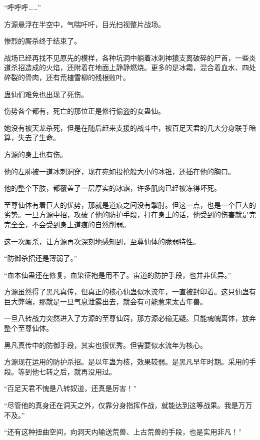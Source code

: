 
\begin{this_body}



“呼呼呼……”

方源悬浮在半空中，气喘吁吁，目光扫视整片战场。

惨烈的厮杀终于结束了。

战场已经再找不见原先的模样，各种坑洞中躺着冰刺神猿支离破碎的尸首，一些炎道杀招造成的火焰，还附着在地面上静静燃烧。更多的是冰霜，混合着血水、四处碎裂的骨肉，还有荒植雪柳的残根败叶。

蛊仙们难免也出现了死伤。

伤势各个都有，死亡的那位正是修行偷盗的女蛊仙。

她没有被天龙杀死，但是在随后赶来支援的战斗中，被百足天君的几大分身联手暗算，失去了生命。

方源的身上也有伤。

他的左肺被一道冰刺洞穿，现在宛如投枪般大小的冰锥，还插在他的胸口。

他的整个下肢，都覆盖了一层厚实的冰霜，许多肌肉已经被冻得坏死。

至尊仙体有着巨大的优势，那就是道痕之间没有掣肘。但这一点，也是一个巨大的劣势。一旦方源中招，攻破了他的防护手段，打在身上的话，他受到的伤害就是完完全全，不会受到身上道痕的自然削弱。

这一次厮杀，让方源再次深刻地感知到，至尊仙体的脆弱特性。

“防御杀招还是薄弱了。”

“血本仙蛊还在修复，血染征袍是用不了。宙道的防护手段，也并非优异。”

方源虽然得了黑凡真传，但真正的核心仙蛊似水流年，一直被封印着。这只仙蛊有巨大弊端，那就是一旦气息泄露出去，就会有可能惹来太古年兽。

一旦八转战力突然进入了方源的至尊仙窍，那方源必输无疑。只能魂魄离体，放弃整个至尊仙体。

黑凡真传中的防御手段，其实也很优秀。但需要似水流年为核心。

方源现在运用的防护杀招。是以年蛊为核，效果较弱。是黑凡早年时期。采用的手段。等到他七转之后，就再没用过。

“百足天君不愧是八转奴道，还真是厉害！”

“尽管他的真身还在洞天之外，仅靠分身指挥作战，就能达到这等战果。我是万万不及。”

“还有这种扭曲空间，向洞天内输送荒兽、上古荒兽的手段，也是实用非凡！”


\end{this_body}

